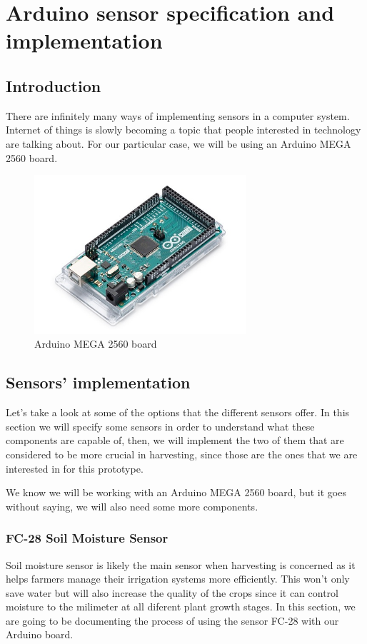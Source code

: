 \chapter{Arduino sensor specification and implementation}\label{cap:implementacion}

\section{Introduction}
There are infinitely many ways of implementing sensors in a computer system. Internet of things is slowly becoming a topic that people interested in technology are talking about. For our particular case, we will be using an Arduino MEGA 2560 board\cite{atmega}.

\begin{figure}[H]
    \centering
    \includegraphics[width=0.7\textwidth]{fig/mega2560.jpg}
    \caption{Arduino MEGA 2560 board}
    \label{fig:mega2560}
\end{figure}


\vspace{7mm}
\section{Sensors' implementation}
Let's take a look at some of the options that the different sensors offer. In this section we will specify some sensors in order to understand what these components are capable of, then, we will implement the two of them that are considered to be more crucial in harvesting, since those are the ones that we are interested in for this prototype. 

We know we will be working with an Arduino MEGA 2560 board, but it goes without saying, we will also need some more components. 

\vspace{7mm}
\subsection{FC-28 Soil Moisture Sensor}
Soil moisture sensor\cite{fc28} is likely the main sensor when harvesting is concerned as it helps farmers manage their irrigation systems more efficiently. This won't only save water but will also increase the quality of the crops since it can control moisture to the milimeter at all diferent plant growth stages. In this section, we are going to be documenting the process of using the sensor FC-28 with our Arduino board.

